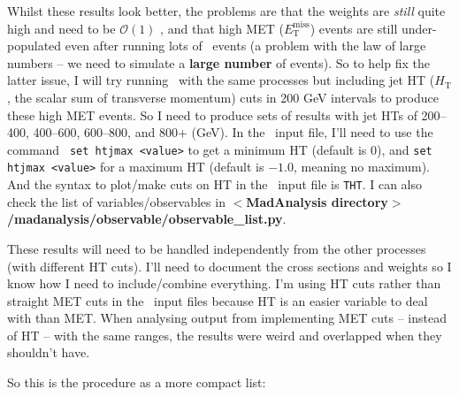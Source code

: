 Whilst these results look better, the problems are that the weights are \emph{still} quite high and need to be $\mathcal{O}(1)$ , and that high MET ($E_{\mathrm{T}}^{\mathrm{miss}}$) events are still under-populated even after running lots of \madgraph\ events (a problem with the law of large numbers -- we need to simulate a \textbf{large number} of events). So to help fix the latter issue, I will try running \madgraph\ with the same processes but including jet HT ($H_{\mathrm{T}}$, the scalar sum of transverse momentum) cuts in 200 GeV intervals to produce these high MET events. So I need to produce sets of results with jet HTs of 200--400, 400--600, 600--800, and 800+ (GeV). In the \madgraph\ input file, I'll need to use the command \verb! set htjmax <value>! to get a minimum HT (default is 0), and \verb!set htjmax <value>! for a maximum HT (default is $-1.0$, meaning no maximum). And the syntax to plot/make cuts on HT in the \madanalysis\ input file is \verb!THT!. I can also check the list of variables/observables in \textbf{$<$MadAnalysis directory$>$/madanalysis/observable/observable\_list.py}.

These results will need to be handled independently from the other processes (with different HT cuts). I'll need to document the cross sections and weights so I know how I need to include/combine everything. I'm using HT cuts rather than straight MET cuts in the \madgraph\ input files because HT is an easier variable to deal with than MET. When analysing output from implementing MET cuts -- instead of HT -- with the same ranges, the results were weird and overlapped when they shouldn't have.

So this is the procedure as a more compact list:

